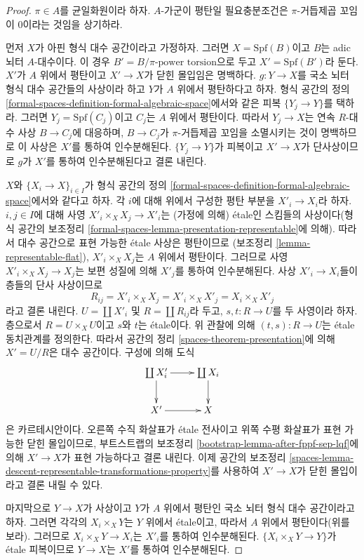 \begin{proof}
$\pi \in A$를 균일화원이라 하자. $A$-가군이 평탄일 필요충분조건은
$\pi$-거듭제곱 꼬임이 $0$이라는 것임을 상기하라.

\medskip\noindent
먼저 $X$가 아핀 형식 대수 공간이라고 가정하자. 그러면
$X = \text{Spf}(B)$이고 $B$는 adic 뇌터 $A$-대수이다. 이 경우
$B' = B/\pi\text{-power torsion}$으로 두고 $X' = \text{Spf}(B')$라 둔다.
$X'$가 $A$ 위에서 평탄이고 $X' \to X$가 닫힌 몰입임은 명백하다.
$g : Y \to X$를 국소 뇌터 형식 대수 공간들의 사상이라 하고 $Y$가
$A$ 위에서 평탄하다고 하자. 형식 공간의 정의
\ref{formal-spaces-definition-formal-algebraic-space}에서와 같은 피복
$\{Y_j \to Y\}$를 택하라. 그러면 $Y_j = \text{Spf}(C_j)$이고 $C_j$는
$A$ 위에서 평탄이다. 따라서
$Y_j \to X$는 연속
$R$-대수 사상 $B \to C_j$에 대응하며, $B \to C_j$가
$\pi$-거듭제곱 꼬임을 소멸시키는 것이 명백하므로 이 사상은 $X'$를
통하여 인수분해된다. $\{Y_j \to Y\}$가 피복이고 $X' \to X$가
단사상이므로 $g$가 $X'$를 통하여 인수분해된다고 결론 내린다.

\medskip\noindent
$X$와 $\{X_i \to X\}_{i \in I}$가 형식 공간의 정의
\ref{formal-spaces-definition-formal-algebraic-space}에서와 같다고 하자.
각 $i$에 대해 위에서 구성한 평탄 부분을 $X'_i \to X_i$라 하자.
$i, j \in I$에 대해 사영 $X'_i \times_X X_j \to X'_i$는
(가정에 의해) \'etale인 스킴들의 사상이다(형식 공간의 보조정리
\ref{formal-spaces-lemma-presentation-representable}에 의해).
따라서 대수 공간으로 표현 가능한 \'etale 사상은 평탄이므로
(보조정리 \ref{lemma-representable-flat}), $X'_i \times_X X_j$는
$A$ 위에서 평탄이다. 그러므로 사영 $X'_i \times_X X_j \to X_j$는
보편 성질에 의해 $X'_j$를 통하여 인수분해된다. 사상
$X'_i \to X_i$들이 층들의 단사 사상이므로
$$
R_{ij} = X'_i \times_X X_j = X'_i \times_X X'_j = X_i \times_X X'_j
$$
라고 결론 내린다. $U = \coprod X'_i$ 및 $R = \coprod R_{ij}$라 두고,
$s, t : R \to U$를 두 사영이라 하자. 층으로서 $R = U \times_X U$이고
$s$와 $t$는 \'etale이다. 위 관찰에 의해
$(t, s) : R \to U$는 \'etale 동치관계를 정의한다. 따라서 공간의 정리
\ref{spaces-theorem-presentation}에 의해 $X' = U/R$은 대수 공간이다.
구성에 의해 도식
$$
\xymatrix{
\coprod X'_i \ar[r] \ar[d] & \coprod X_i \ar[d] \\
X' \ar[r] & X
}
$$
은 카르테시안이다. 오른쪽 수직 화살표가 \'etale 전사이고 위쪽 수평
화살표가 표현 가능한 닫힌 몰입이므로, 부트스트랩의 보조정리
\ref{bootstrap-lemma-after-fppf-sep-lqf}에 의해 $X' \to X$가 표현 가능하다고
결론 내린다. 이제 공간의 보조정리
\ref{spaces-lemma-descent-representable-transformations-property}를 사용하여
$X' \to X$가 닫힌 몰입이라고 결론 내릴 수 있다.

\medskip\noindent
마지막으로 $Y \to X$가 사상이고 $Y$가 $A$ 위에서 평탄인 국소 뇌터
형식 대수 공간이라고 하자. 그러면 각각의 $X_i \times_X Y$는 $Y$ 위에서
\'etale이고, 따라서 $A$ 위에서 평탄이다(위를 보라). 그러므로
$X_i \times_X Y \to X_i$는 $X'_i$를 통하여 인수분해된다.
$\{X_i \times_X Y \to Y\}$가 \'etale 피복이므로 $Y \to X$는 $X'$를
통하여 인수분해된다.
\end{proof}

